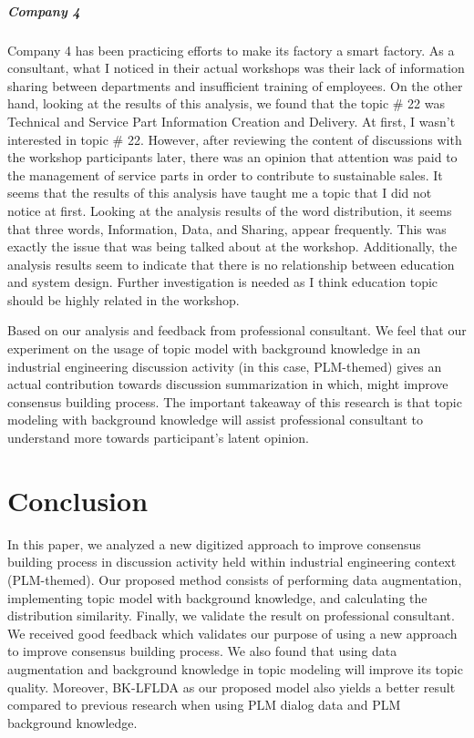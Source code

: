 \documentclass[senior]{IPSstyle}
\begin{document}
\paragraph{Company 4} Company 4 has been practicing efforts to make its factory a smart factory. As a consultant, what I noticed in their actual workshops was their lack of information sharing between departments and insufficient training of employees. On the other hand, looking at the results of this analysis, we found that the topic \# 22 was Technical and Service Part Information Creation and Delivery. At first, I wasn’t interested in topic \# 22. However, after reviewing the content of discussions with the workshop participants later, there was an opinion that attention was paid to the management of service parts in order to contribute to sustainable sales. It seems that the results of this analysis have taught me a topic that I did not notice at first. Looking at the analysis results of the word distribution, it seems that three words, Information, Data, and Sharing, appear frequently. This was exactly the issue that was being talked about at the workshop. Additionally, the analysis results seem to indicate that there is no relationship between education and system design. Further investigation is needed as I think education topic should be highly related in the workshop.
\bigskip

Based on our analysis and feedback from professional consultant. We feel that our experiment on the usage of topic model with background knowledge in an industrial engineering discussion activity (in this case, PLM-themed) gives an actual contribution towards discussion summarization in which, might improve consensus building process. The important takeaway of this research is that topic modeling with background knowledge will assist professional consultant to understand more towards participant’s latent opinion.

\chapter{Conclusion} 
\label{chapter_5}

In this paper, we analyzed a new digitized approach to improve consensus building process in discussion activity held within industrial engineering context (PLM-themed). Our proposed method consists of performing data augmentation, implementing topic model with background knowledge, and calculating the distribution similarity. Finally, we validate the result on professional consultant. We received good feedback which validates our purpose of using a new approach to improve consensus building process. We also found that using data augmentation and background knowledge in topic modeling will improve its topic quality. Moreover, BK-LFLDA as our proposed model also yields a better result compared to previous research when using PLM dialog data and PLM background knowledge. 
\end{document}
